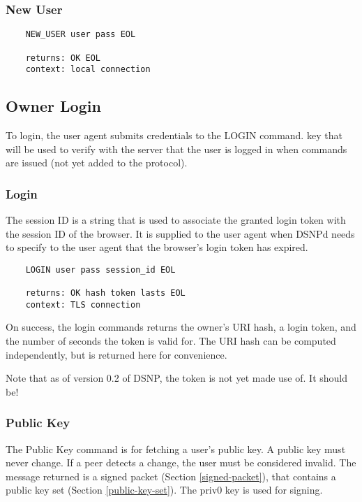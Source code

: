 \documentclass[letterpaper,11pt,oneside]{article}
\begin{document}
\subsubsection{New User}

\vspace{10pt}
\begin{verbatim}
    NEW_USER user pass EOL

    returns: OK EOL
    context: local connection
\end{verbatim}

\subsection{Owner Login}

To login, the user agent submits credentials to the LOGIN command. key that
will be used to verify with the server that the user is logged in when commands
are issued (not yet added to the protocol).

\subsubsection{Login}

The session ID is a string that is used to associate the granted login token
with the session ID of the browser. It is supplied to the user agent when DSNPd
needs to specify to the user agent that the browser's login token has expired.

\vspace{10pt}
\begin{verbatim}
    LOGIN user pass session_id EOL

    returns: OK hash token lasts EOL
    context: TLS connection
\end{verbatim}
\vspace{10pt}

On success, the login commands returns the owner's URI hash, a login token, and
the number of seconds the token is valid for. The URI hash can be computed
independently, but is returned here for convenience.

Note that as of version 0.2 of DSNP, the token is not yet made use of. It
should be!

\subsubsection{Public Key}
\label{public-key-command}

The Public Key command is for fetching a user's public key. A public key must
never change. If a peer detects a change, the user must be considered invalid.
The message returned is a signed packet (Section \ref{signed-packet}), that
contains a public key set (Section \ref{public-key-set}). The priv0 key is used
for signing.
\end{document}
